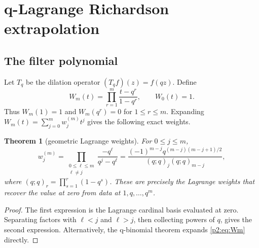 \documentclass[11pt,oneside]{article}
\numberwithin{equation}{section}
\newtheorem{theorem}{Theorem}[section]
\theoremstyle{definition}
\theoremstyle{remark}
\begin{document}
\section{q-Lagrange Richardson extrapolation}
\label{p2:sec:filter}

\subsection{The filter polynomial}

Let \(T_q\) be the dilation operator \((T_qf)(z)=f(qz)\). Define
\begin{equation}
 W_m(t)=\prod_{r=1}^m\frac{t-q^r}{1-q^r},
 \qquad W_0(t)=1.
 \label{p2:eq:Wm}
\end{equation}
Thus \(W_m(1)=1\) and \(W_m(q^r)=0\) for \(1\leq r\leq m\).
Expanding \(W_m(t)=\sum_{j=0}^m w_j^{(m)}t^j\) gives the following exact
weights.

\begin{theorem}[geometric Lagrange weights]
\label{p2:thm:weights}
For \(0\leq j\leq m\),
\begin{equation}
 w_j^{(m)}
 =\prod_{\substack{0\leq\ell\leq m\\\ell\ne j}}
 \frac{-q^\ell}{q^j-q^\ell}
 =\frac{(-1)^{m-j}q^{(m-j)(m-j+1)/2}}
 {(q;q)_j(q;q)_{m-j}},
 \label{p2:eq:weights}
\end{equation}
where \((q;q)_r=\prod_{s=1}^r(1-q^s)\). These are precisely the Lagrange
weights that recover the value at zero from data at \(1,q,\ldots,q^m\).
\end{theorem}

\begin{proof}
The first expression is the Lagrange cardinal basis evaluated at zero. Separating
factors with \(\ell<j\) and \(\ell>j\), then collecting powers of \(q\), gives the
second expression. Alternatively, the q-binomial theorem expands
\eqref{p2:eq:Wm} directly.
\end{proof}
\end{document}
